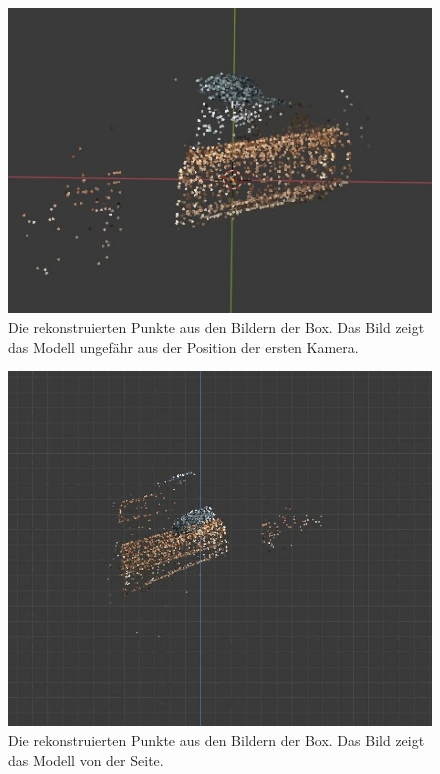 \begin{figure}
    \includegraphics[width=\textwidth]{src/img/box_model.jpg}
    \caption{Die rekonstruierten Punkte aus den Bildern der Box. Das Bild zeigt das Modell ungefähr aus der Position der ersten Kamera.}
    \label{fig:box-model}
\end{figure}

\begin{figure}
    \includegraphics[width=\textwidth]{src/img/box_model_2.jpg}
    \caption{Die rekonstruierten Punkte aus den Bildern der Box. Das Bild zeigt das Modell von der Seite.}
    \label{fig:box-model-2}
\end{figure}
